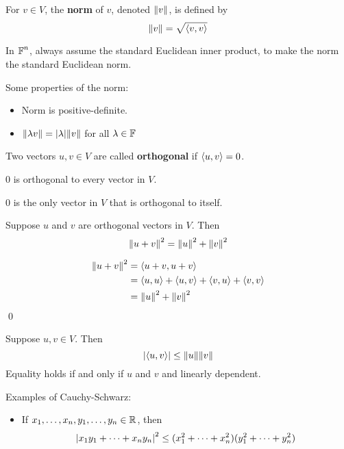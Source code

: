 \begin{definition}
    For $v \in V$, the \textbf{norm} of $v$, denoted $\norm{v}$, is defined by
    \[ \norm{v} = \sqrt{\left\langle v, v \right\rangle} \]
\end{definition}

In $\operatorname{\mathbb{F}}^n$, always assume the standard Euclidean inner product, to make the norm the standard
Euclidean norm.

Some properties of the norm:
\begin{itemize}
    \item Norm is positive-definite.
    \item $\norm{\lambda v} =  \abs{\lambda} \norm{v}$ for all $\lambda \in \operatorname{\mathbb{F}}$
\end{itemize}

\begin{definition} [Orthogonal]
    Two vectors $u, v \in V$ are called \textbf{orthogonal} if $\left\langle u, v \right\rangle = 0$.
\end{definition}

\begin{theorem}
    0 is orthogonal to every vector in $V$.

    0 is the only vector in $V$ that is orthogonal to itself.
\end{theorem}

\begin{theorem} 
    Suppose $u$ and $v$ are orthogonal vectors in $V$. Then
    \[ \norm{u + v}^2 = \norm{u}^2 + \norm{v}^2 \]

    \begin{proof*}
        \begin{align*}
            \norm{u + v}^2 &= \left\langle u + v, u + v \right\rangle \\
            &= \left\langle u, u \right\rangle + \left\langle u, v \right\rangle + \left\langle v, u \right\rangle + \left\langle v, v \right\rangle \\
            &= \norm{u}^2 + \norm{v}^2
        \end{align*} \qed
    \end{proof*}
\end{theorem}

\begin{theorem} 
    Suppose $u, v \in V$. Then
    \[ \abs{\left\langle u, v \right\rangle} \leq \norm{u} \norm{v} \]
    Equality holds if and only if $u$ and $v$ and linearly dependent.
\end{theorem}

\begin{example}
    Examples of Cauchy-Schwarz:
    \begin{itemize}
        \item If $x_1, \dots, x_n, y_1, \dots, y_n \in \operatorname{\mathbb{R}}$, then
        \[ \abs{x_1 y_1 + \dots + x_n y_n}^2 \leq (x_1^2 + \dots + x_n^2)(y_1^2 + \dots + y_n^2) \]
    \end{itemize}
\end{example}

